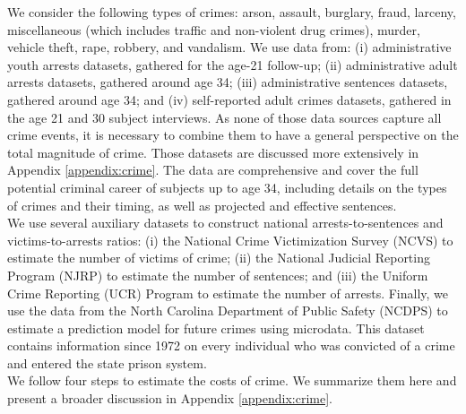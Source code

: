 \noindent We consider the following types of crimes: arson, assault, burglary, fraud, larceny, miscellaneous (which includes traffic and non-violent drug crimes), murder, vehicle theft, rape, robbery, and vandalism. We use data from: (i) administrative youth arrests datasets, gathered for the age-21 follow-up; (ii) administrative adult arrests datasets, gathered around age 34; (iii) administrative sentences datasets, gathered around age 34; and (iv) self-reported adult crimes datasets, gathered in the age 21 and 30 subject interviews. As none of those data sources capture all crime events, it is necessary to combine them to have a general perspective on the total magnitude of crime. Those datasets are discussed more extensively in Appendix \ref{appendix:crime}. The data are comprehensive and cover the full potential criminal career of subjects up to age 34, including details on the types of crimes and their timing, as well as projected and effective sentences. \\

\noindent We use several auxiliary datasets to construct national arrests-to-sentences and victims-to-arrests ratios: (i) the National Crime Victimization Survey (NCVS) to estimate the number of victims of crime; (ii) the National Judicial Reporting Program (NJRP) to estimate the number of sentences; and (iii) the Uniform Crime Reporting (UCR) Program to estimate the number of arrests. Finally, we use the data from the North Carolina Department of Public Safety (NCDPS) to estimate a prediction model for future crimes using microdata. This dataset contains information since 1972 on every individual who was convicted of a crime and entered the state prison system. \\

\noindent We follow four steps to estimate the costs of crime. We summarize them here and present a broader discussion in
Appendix \ref{appendix:crime}. \\

